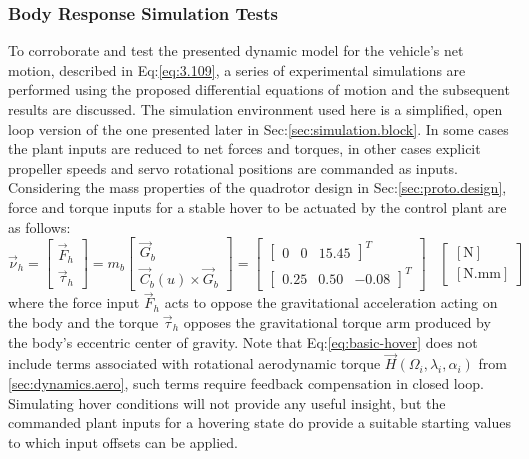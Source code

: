 \subsubsection{Body Response Simulation Tests}
\label{subsubsec:dynamicsimulation}
To corroborate and test the presented dynamic model for the vehicle's net motion, described in Eq:\ref{eq:3.109}, a series of experimental simulations are performed using the proposed differential equations of motion and the subsequent results are discussed. The simulation environment used here is a simplified, open loop version of the one presented later in Sec:\ref{sec:simulation.block}. In some cases the plant inputs are reduced to net forces and torques, in other cases explicit propeller speeds and servo rotational positions are commanded as inputs. Considering the mass properties of the quadrotor design in Sec:\ref{sec:proto.design}, force and torque inputs for a stable hover to be actuated by the control plant are as follows:
\begin{equation}\label{eq:basic-hover}
\vec{\nu}_h=\begin{bmatrix}
\vec{F}_h\\
\vec{\tau}_h
\end{bmatrix}=m_b\begin{bmatrix}
\vec{G}_b\\
\vec{C}_b(u)\times \vec{G}_b
\end{bmatrix}=\begin{bmatrix}
\begin{bmatrix}
0 & 0 & 15.45
\end{bmatrix}^T
\\
\begin{bmatrix}
0.25 & 0.50 & -0.08
\end{bmatrix}^T
\end{bmatrix}
~~~~\begin{bmatrix}
[\text{N}]\\
[\text{N.mm}]
\end{bmatrix}
\end{equation}
where the force input $\vec{F}_h$ acts to oppose the gravitational acceleration acting on the body and the torque $\vec{\tau}_h$ opposes the gravitational torque arm produced by the body's eccentric center of gravity. Note that Eq:\ref{eq:basic-hover} does not include terms associated with rotational aerodynamic torque $\vec{H}(\Omega_i,\lambda_i,\alpha_i)$ from \ref{sec:dynamics.aero}, such terms require feedback compensation in closed loop. Simulating hover conditions will not provide any useful insight, but the commanded plant inputs for a hovering state do provide a suitable starting values to which input offsets can be applied. 

